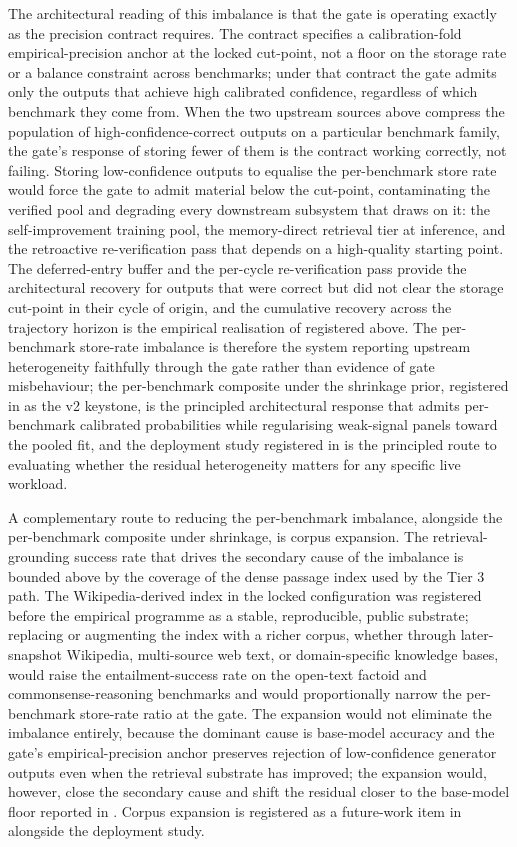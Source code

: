 The architectural reading of this imbalance is that the gate is operating exactly as the precision contract requires. The contract specifies a calibration-fold empirical-precision anchor at the locked cut-point, not a floor on the storage rate or a balance constraint across benchmarks; under that contract the gate admits only the outputs that achieve high calibrated confidence, regardless of which benchmark they come from. When the two upstream sources above compress the population of high-confidence-correct outputs on a particular benchmark family, the gate's response of storing fewer of them is the contract working correctly, not failing. Storing low-confidence outputs to equalise the per-benchmark store rate would force the gate to admit material below the cut-point, contaminating the verified pool and degrading every downstream subsystem that draws on it: the self-improvement training pool, the memory-direct retrieval tier at inference, and the retroactive re-verification pass that depends on a high-quality starting point. The deferred-entry buffer and the per-cycle re-verification pass provide the architectural recovery for outputs that were correct but did not clear the storage cut-point in their cycle of origin, and the cumulative recovery across the trajectory horizon is the empirical realisation of  registered above. The per-benchmark store-rate imbalance is therefore the system reporting upstream heterogeneity faithfully through the gate rather than evidence of gate misbehaviour; the per-benchmark composite under the shrinkage prior, registered in  as the v2 keystone, is the principled architectural response that admits per-benchmark calibrated probabilities while regularising weak-signal panels toward the pooled fit, and the deployment study registered in  is the principled route to evaluating whether the residual heterogeneity matters for any specific live workload.

A complementary route to reducing the per-benchmark imbalance, alongside the per-benchmark composite under shrinkage, is corpus expansion. The retrieval-grounding success rate that drives the secondary cause of the imbalance is bounded above by the coverage of the dense passage index used by the Tier 3 path. The Wikipedia-derived index in the locked configuration was registered before the empirical programme as a stable, reproducible, public substrate; replacing or augmenting the index with a richer corpus, whether through later-snapshot Wikipedia, multi-source web text, or domain-specific knowledge bases, would raise the entailment-success rate on the open-text factoid and commonsense-reasoning benchmarks and would proportionally narrow the per-benchmark store-rate ratio at the gate. The expansion would not eliminate the imbalance entirely, because the dominant cause is base-model accuracy and the gate's empirical-precision anchor preserves rejection of low-confidence generator outputs even when the retrieval substrate has improved; the expansion would, however, close the secondary cause and shift the residual closer to the base-model floor reported in . Corpus expansion is registered as a future-work item in  alongside the deployment study.

